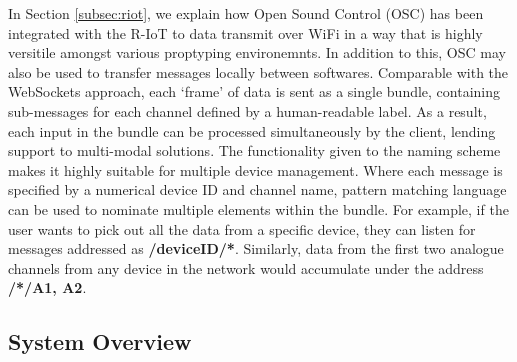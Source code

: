 %
In Section \ref{subsec:riot}, we explain how Open Sound Control (OSC) has been integrated with the R-IoT  to data transmit over WiFi in a way that is highly versitile amongst various proptyping environemnts. In addition to this, OSC may also be used to transfer messages locally between softwares. Comparable with the WebSockets approach, each ‘frame’ of data is sent as a single bundle, containing sub-messages for each channel defined by a human-readable label. As a result, each input in the bundle can be processed simultaneously by the client, lending support to multi-modal solutions. The functionality given to the naming scheme makes it highly suitable for multiple device management. Where each message is specified by a numerical device ID and channel name, pattern matching language can be used to nominate multiple elements within the bundle. For example, if the user wants to pick out all the data from a specific device, they can listen for messages addressed as \textbf{/deviceID/*}. Similarly, data from the first two analogue channels from any device in the network would accumulate under the address \textbf{/*/{A1, A2}}.

\subsection{System Overview}

